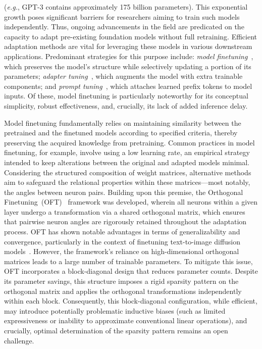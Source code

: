 (\emph{e.g.}, GPT-3 contains approximately 175 billion parameters). This exponential growth poses significant barriers for researchers aiming to train such models independently. Thus, ongoing advancements in the field are predicated on the capacity to adapt pre-existing foundation models without full retraining. Efficient adaptation methods are vital for leveraging these models in various downstream applications. Predominant strategies for this purpose include: \emph{model finetuning}~\cite{hulora2022,zaken2022bitfit,guo2020parameter,raffel2020exploring,qiu2023controlling,zhang2022adaptive,chavan2023one}, which preserves the model’s structure while selectively updating a portion of its parameters; \emph{adapter tuning}~\cite{rebuffi2017learning,houlsby2019parameter,pfeiffer2020adapterfusion,lin2020exploring,he2021towards}, which augments the model with extra trainable components; and \emph{prompt tuning}~\cite{li2021prefix,lester2021power}, which attaches learned prefix tokens to model inputs. Of these, model finetuning is particularly noteworthy for its conceptual simplicity, robust effectiveness, and, crucially, its lack of added inference delay.

Model finetuning fundamentally relies on maintaining similarity between the pretrained and the finetuned models according to specified criteria, thereby preserving the acquired knowledge from pretraining. Common practices in model finetuning, for example, involve using a low learning rate, an empirical strategy intended to keep alterations between the original and adapted models minimal. Considering the structured composition of weight matrices, alternative methods aim to safeguard the relational properties within these matrices—most notably, the angles between neuron pairs. Building upon this premise, the Orthogonal Finetuning~(OFT)~\cite{qiu2023controlling} framework was developed, wherein all neurons within a given layer undergo a transformation via a shared orthogonal matrix, which ensures that pairwise neuron angles are rigorously retained throughout the adaptation process. OFT has shown notable advantages in terms of generalizability and convergence, particularly in the context of finetuning text-to-image diffusion models~\cite{qiu2023controlling}. However, the framework’s reliance on high-dimensional orthogonal matrices leads to a large number of trainable parameters. To mitigate this issue, OFT incorporates a block-diagonal design that reduces parameter counts. Despite its parameter savings, this structure imposes a rigid sparsity pattern on the orthogonal matrix and applies the orthogonal transformations independently within each block. Consequently, this block-diagonal configuration, while efficient, may introduce potentially problematic inductive biases (such as limited expressiveness or inability to approximate conventional linear operations), and crucially, optimal determination of the sparsity pattern remains an open challenge.

